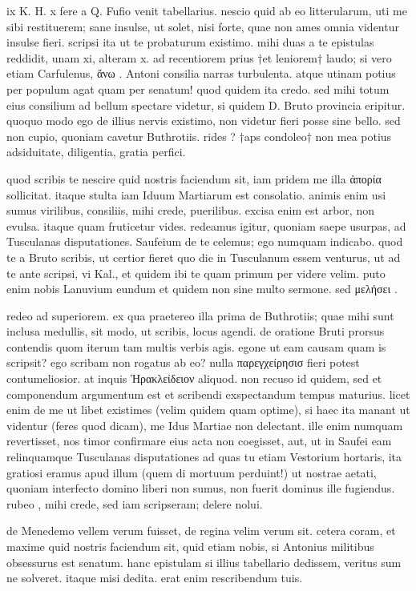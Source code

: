 


 ix K. H. x fere a Q. Fufio venit tabellarius. nescio quid ab eo litterularum, uti me sibi restituerem; sane insulse, ut solet, nisi forte, quae non ames omnia videntur insulse fieri. scripsi ita ut te probaturum existimo. mihi duas a te epistulas reddidit, unam xi, alteram x. ad recentiorem prius †et leniorem† laudo; si vero etiam Carfulenus, ἄνω . Antoni consilia narras turbulenta. atque utinam potius per populum agat quam per senatum! quod quidem ita credo. sed mihi totum eius consilium ad bellum spectare videtur, si quidem D. Bruto provincia eripitur. quoquo modo ego de illius nervis existimo, non videtur fieri posse sine bello. sed non cupio, quoniam cavetur Buthrotiis. rides ? †aps condoleo† non mea potius adsiduitate, diligentia, gratia perfici.

 quod scribis te nescire quid nostris faciendum sit, iam pridem me illa ἀπορία sollicitat. itaque stulta iam Iduum Martiarum est consolatio. animis enim usi sumus virilibus, consiliis, mihi crede, puerilibus. excisa enim est arbor, non evulsa. itaque quam fruticetur vides. redeamus igitur, quoniam saepe usurpas, ad Tusculanas disputationes. Saufeium de te celemus; ego numquam indicabo. quod te a Bruto scribis, ut certior fieret quo die in Tusculanum essem venturus, ut ad te ante scripsi, vi Kal., et quidem ibi te quam primum per videre velim. puto enim nobis Lanuvium eundum et quidem non sine multo sermone. sed μελήσει .

 redeo ad superiorem. ex qua praetereo illa prima de Buthrotiis; quae mihi sunt inclusa medullis, sit modo, ut scribis, locus agendi. de oratione Bruti prorsus contendis quom iterum tam multis verbis agis. egone ut eam causam quam is scripsit? ego scribam non rogatus ab eo? nulla παρεγχείρησισ fieri potest contumeliosior. at inquis Ἡρακλείδειον aliquod. non recuso id quidem, sed et componendum argumentum est et scribendi exspectandum tempus maturius. licet enim de me ut libet existimes (velim quidem quam optime), si haec ita manant ut videntur (feres quod dicam), me Idus Martiae non delectant. ille enim numquam revertisset, nos timor confirmare eius acta non coegisset, aut, ut in Saufei eam relinquamque Tusculanas disputationes ad quas tu etiam Vestorium hortaris, ita gratiosi eramus apud illum (quem di mortuum perduint!) ut nostrae aetati, quoniam interfecto domino liberi non sumus, non fuerit dominus ille fugiendus. rubeo , mihi crede, sed iam scripseram; delere nolui.

 de Menedemo vellem verum fuisset, de regina velim verum sit. cetera coram, et maxime quid nostris faciendum sit, quid etiam nobis, si Antonius militibus obsessurus est senatum. hanc epistulam si illius tabellario dedissem, veritus sum ne solveret. itaque misi dedita. erat enim rescribendum tuis.
